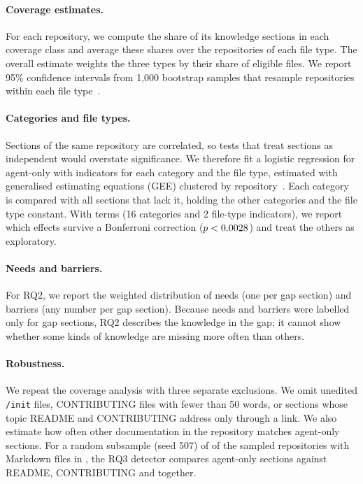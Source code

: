 \documentclass[sigconf,nonacm]{acmart}
\begin{document}
\paragraph{Coverage estimates.} For each repository, we compute the share of its knowledge sections
in each coverage class and average these shares over the repositories of each file type. The overall
estimate weights the three types by their share of eligible files. We report 95\% confidence
intervals from 1{,}000 bootstrap samples that resample repositories within each file
type~\cite{efron1993bootstrap}.

\paragraph{Categories and file types.} Sections of the same repository are correlated, so tests that
treat sections as independent would overstate significance. We therefore fit a logistic regression
for agent-only with indicators for each category and the file type, estimated with generalised
estimating equations (GEE) clustered by repository~\cite{liang1986gee}. Each category is compared
with all sections that lack it, holding the other categories and the file type constant. With
\geeNTerms{} terms (16 categories and 2 file-type indicators), we report which effects survive a
Bonferroni correction ($p < 0.0028$) and treat the others as exploratory.

\paragraph{Needs and barriers.} For RQ2, we report the weighted distribution of needs (one per gap
section) and barriers (any number per gap section). Because needs and barriers were labelled only
for gap sections, RQ2 describes the knowledge in the gap; it cannot show whether some kinds of
knowledge are missing more often than others.

\paragraph{Robustness.} We repeat the coverage analysis with three separate exclusions. We omit
unedited \texttt{/init} files, CONTRIBUTING files with fewer than 50 words, or sections whose
topic README and CONTRIBUTING address only through a link. We also estimate how often other
documentation in the repository matches agent-only sections. For a random subsample (seed 507) of \nDocsSubsample{} of the
\nDocsRepos{} sampled repositories with Markdown files in , the RQ3 detector compares
agent-only sections against README, CONTRIBUTING and  together.
\end{document}
